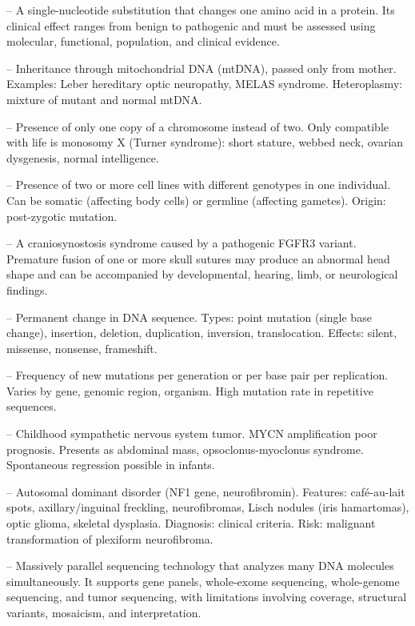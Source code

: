 -- A single-nucleotide substitution that changes one amino acid in a protein. Its clinical effect ranges from benign to pathogenic and must be assessed using molecular, functional, population, and clinical evidence.

-- Inheritance through mitochondrial DNA (mtDNA), passed only from mother. Examples: Leber hereditary optic neuropathy, MELAS syndrome. Heteroplasmy: mixture of mutant and normal mtDNA.

-- Presence of only one copy of a chromosome instead of two. Only compatible with life is monosomy X (Turner syndrome): short stature, webbed neck, ovarian dysgenesis, normal intelligence.

-- Presence of two or more cell lines with different genotypes in one individual. Can be somatic (affecting body cells) or germline (affecting gametes). Origin: post-zygotic mutation.

-- A craniosynostosis syndrome caused by a pathogenic FGFR3 variant. Premature fusion of one or more skull sutures may produce an abnormal head shape and can be accompanied by developmental, hearing, limb, or neurological findings.

-- Permanent change in DNA sequence. Types: point mutation (single base change), insertion, deletion, duplication, inversion, translocation. Effects: silent, missense, nonsense, frameshift.

-- Frequency of new mutations per generation or per base pair per replication. Varies by gene, genomic region, organism. High mutation rate in repetitive sequences.

-- Childhood sympathetic nervous system tumor. MYCN amplification poor prognosis. Presents as abdominal mass, opsoclonus-myoclonus syndrome. Spontaneous regression possible in infants.

-- Autosomal dominant disorder (NF1 gene, neurofibromin). Features: café-au-lait spots, axillary/inguinal freckling, neurofibromas, Lisch nodules (iris hamartomas), optic glioma, skeletal dysplasia. Diagnosis: clinical criteria. Risk: malignant transformation of plexiform neurofibroma.

-- Massively parallel sequencing technology that analyzes many DNA molecules simultaneously. It supports gene panels, whole-exome sequencing, whole-genome sequencing, and tumor sequencing, with limitations involving coverage, structural variants, mosaicism, and interpretation.

